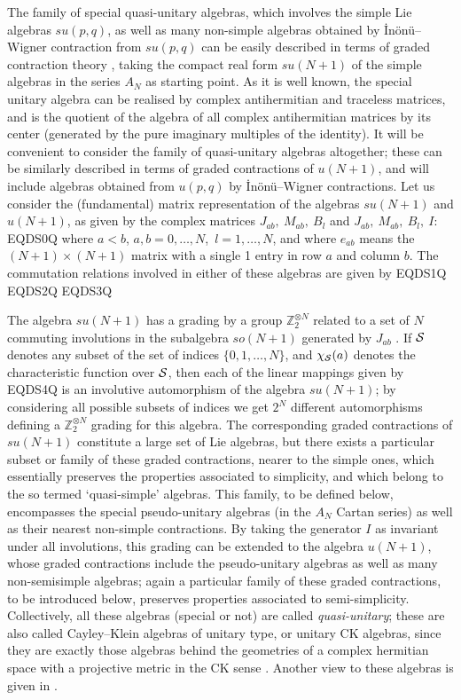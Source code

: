 \documentclass[12pt]{article}
\begin{document}
The family of special quasi-unitary algebras, which involves the simple
Lie algebras $su(p,q)$, as well as many non-simple algebras obtained
by \.In\"on\"u--Wigner \cite{Ino.Wig:53} contraction from $su(p,q)$ can be
easily described in terms of graded contraction theory
\cite{Mon.Pat:91,Moo.Pat:91}, taking the compact real form
$su(N+1)$ of the simple algebras in the series
$A_N$ as starting point. As it is well known, the special unitary algebra
can be realised by complex antihermitian and traceless matrices, and is the
quotient of the algebra of all complex antihermitian matrices by its
center (generated by the pure imaginary multiples of the identity). It
 will be convenient to consider the family of quasi-unitary algebras
altogether; these can be similarly described in terms of graded
contractions of $u(N+1)$, and will include algebras obtained from $u(p,q)$
by \.In\"on\"u--Wigner contractions. Let us consider the (fundamental)
matrix representation of the algebras
$su(N+1)$ and
$u(N+1)$, as given by the complex matrices
${J}_{ab},\ {M}_{ab},\ {B}_l$ and ${J}_{ab},\ {M}_{ab},\ {B}_l,\ {I}$:
EQDS0Q
where $a<b$, $a,b=0,\dots,N$,\  $l=1,\dots,N$, and where $e_{ab}$ means
the $(N+1) \times (N+1)$ matrix with a single  1 entry in row $a$ and
column $b$. The commutation relations involved in either of these
algebras are given by
EQDS1Q
EQDS2Q
EQDS3Q

The algebra $su(N+1)$ has a grading by a group
$\mathbb{Z}_2^{\otimes N}$
related to a set of $N$ commuting involutions in the
subalgebra $so(N+1)$ generated by ${J}_{ab}$
\cite{Her.Mon.Olm.San:94,Her.San:96b}.
If ${{\cal S}}$ denotes any subset of the set of indices $\{0, 1, \dots, N\}$,
and $\chi_{{\cal S}}(a)$ denotes the characteristic function over ${{\cal S}}$,
then each of the linear mappings given by
EQDS4Q
is an involutive automorphism of the algebra $su(N+1)$; by
considering all possible subsets of indices we get $2^N$ different
automorphisms defining a $\mathbb{Z}_2^{\otimes N}$ grading for this
algebra. The corresponding graded contractions of
$su(N+1)$ constitute a large set of Lie algebras, but there exists
a particular subset or family of these graded contractions, nearer
to the simple ones, which essentially
preserves the properties
associated to simplicity, and which belong to the so termed
\cite{Roz:88, Roz:97} `quasi-simple' algebras. This family, to be defined
below, encompasses the special pseudo-unitary algebras (in the $A_N$ Cartan
series)  as well as their nearest non-simple contractions. By taking the
generator ${I}$ as invariant under all involutions, this grading can
be extended to the algebra $u(N+1)$, whose graded contractions include the
pseudo-unitary algebras as well as many non-semisimple algebras;  again a
particular family of these graded contractions, to be introduced below,
preserves properties associated to semi-simplicity.  Collectively, all these
algebras (special or not) are called
\emph{quasi-unitary}; these are also called Cayley--Klein algebras of unitary
type, or unitary CK algebras, since they are exactly those
algebras behind the geometries of a complex hermitian space  with a
projective metric in the CK sense \cite{Roz:97}. Another
view to these algebras is given in \cite{Gro.Man:90}.
\end{document}

